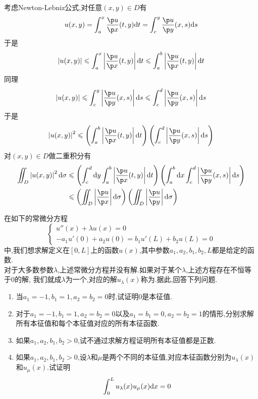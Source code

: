 \documentclass{ctexart}
\begin{document}
\begin{solution}
    考虑Newton-Lebniz公式,对任意$(x,y)\in D$有
    \[u(x,y)=\int_a^x\dfrac{\p u}{\p x}(t,y)\di t=\int_c^y\dfrac{\p u}{\p y}(x,s)\di s\]
    于是
    \[\left|u(x,y)\right|\leqslant\int_a^x\left|\dfrac{\p u}{\p x}(t,y)\right|\di t\leqslant\int_a^b\left|\dfrac{\p u}{\p x}(t,y)\right|\di t\]
    同理
    \[\left|u(x,y)\right|\leqslant\int_c^y\left|\dfrac{\p u}{\p y}(x,s)\right|\di s\leqslant\int_c^d\left|\dfrac{\p u}{\p y}(x,s)\right|\di s\]
    于是
    \[\left|u(x,y)\right|^2\leqslant\left(\int_a^b\left|\dfrac{\p u}{\p x}(t,y)\right|\di t\right)\left(\int_c^d\left|\dfrac{\p u}{\p y}(x,s)\right|\di s\right)\]
    对$(x,y)\in D$做二重积分有
    \[\begin{aligned}
        \iint_D\left|u(x,y)\right|^2\di\sigma
        &\leqslant \left(\int_c^d\di y\int_a^b\left|\dfrac{\p u}{\p x}(t,y)\right|\di t\right)\left(\int_a^b\di x\int_c^d\left|\dfrac{\p u}{\p y}(x,s)\right|\di s\right) \\
        &\leqslant \left(\iint_D\left|\dfrac{\p u}{\p x}\right|\di\sigma\right)\left(\iint_D\left|\dfrac{\p u}{\p y}\right|\di\sigma\right)
    \end{aligned}\]

\end{solution}
\begin{problem}[9.(15\songti{分})]
    在如下的常微分方程
    \[\left\{\begin{array}{l}
        u''(x)+\lambda u(x)=0\\
        -a_1u'(0)+a_2u(0)=b_1u'(L)+b_2u(L)=0
    \end{array}\right.\]
    中,我们想求解定义在$[0,L]$上的函数$u(x)$,其中参数$a_1,a_2,b_1,b_2,L$都是给定的函数.\\
    对于大多数参数$\lambda$,上述常微分方程并没有解.如果对于某个$\lambda$,上述方程存在不恒等于$0$的解,%
    我们就成$\lambda$为一个,对应的解$u_\lambda(x)$称为.据此,回答下列问题.
    \begin{enumerate}[label=\tbf{(\arabic*)}]
        \item 当$a_1=-1,b_1=1,a_2=b_2=0$时,试证明$0$是本征值.
        \item 对于$a_1=-1,b_1=1,a_2=b_2=0$以及$a_1=b_1=0,a_2=b_2=1$的情形,分别求解所有本征值和每个本征值对应的所有本征函数.
        \item 如果$a_1,a_2,b_1,b_2>0$,试不通过求解方程证明所有本征值都是正数.
        \item 如果$a_1,a_2,b_1,b_2>0$,设$\lambda$和$\mu$是两个不同的本征值,对应本征函数分别为$u_\lambda(x)$和$u_\mu(x)$.试证明
            \[\int_0^Lu_\lambda(x)u_\mu(x)\mathrm{d} x=0\]

    \end{enumerate}
\end{problem}
\end{document}
